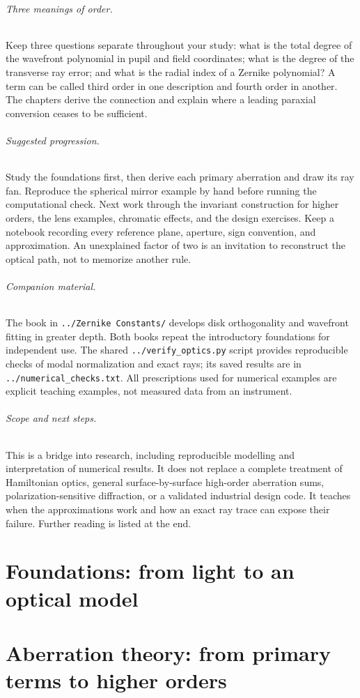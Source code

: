 \documentclass[11pt,a4paper,oneside,openany]{book}
\begin{document}
\paragraph{Three meanings of order.}
Keep three questions separate throughout your study: what is the total degree of the wavefront polynomial in pupil and field coordinates; what is the degree of the transverse ray error; and what is the radial index of a Zernike polynomial? A term can be called third order in one description and fourth order in another. The chapters derive the connection and explain where a leading paraxial conversion ceases to be sufficient.

\paragraph{Suggested progression.}
Study the foundations first, then derive each primary aberration and draw its ray fan. Reproduce the spherical mirror example by hand before running the computational check. Next work through the invariant construction for higher orders, the lens examples, chromatic effects, and the design exercises. Keep a notebook recording every reference plane, aperture, sign convention, and approximation. An unexplained factor of two is an invitation to reconstruct the optical path, not to memorize another rule.

\paragraph{Companion material.}
The book in \texttt{../Zernike Constants/} develops disk orthogonality and wavefront fitting in greater depth. Both books repeat the introductory foundations for independent use. The shared \texttt{../verify\_optics.py} script provides reproducible checks of modal normalization and exact rays; its saved results are in \texttt{../numerical\_checks.txt}. All prescriptions used for numerical examples are explicit teaching examples, not measured data from an instrument.

\paragraph{Scope and next steps.}
This is a bridge into research, including reproducible modelling and interpretation of numerical results. It does not replace a complete treatment of Hamiltonian optics, general surface-by-surface high-order aberration sums, polarization-sensitive diffraction, or a validated industrial design code. It teaches when the approximations work and how an exact ray trace can expose their failure. Further reading is listed at the end.


\tableofcontents
\mainmatter
\part{Foundations: from light to an optical model}

\part{Aberration theory: from primary terms to higher orders}

\end{document}

